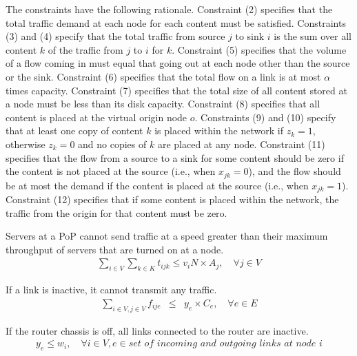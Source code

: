

The constraints have the following rationale.
Constraint (2) specifies that the total traffic demand at each node for each content must be satisfied.
Constraints (3) and (4) specify that the total traffic from source $j$ to sink $i$ is the sum over all content $k$ of the traffic from $j$ to $i$ for $k$.
Constraint (5) specifies that the volume of a flow coming in must equal that going out at each node other than the source or the sink.
Constraint (6) specifies that the total flow on a link is at most $\alpha$ times capacity.
Constraint (7) specifies that the total size of all content stored at a node must be less than its disk capacity.
Constraint (8) specifies that all content is placed at the virtual origin node $o$.
Constraints (9) and (10) specify that at least one copy of content $k$ is placed within the network if $z_k = 1$, otherwise $z_k = 0$ and no copies of $k$ are placed at any node. Constraint (11) specifies that the flow from a source to a sink for some content should be zero if the content is not placed at the source (i.e., when $x_{jk} = 0$), and the flow should be at most the demand if the content is placed at the source  (i.e., when $x_{jk} = 1$).
Constraint (12) specifies that if some content is placed within the network, the traffic from the origin for that content must be zero. 



Servers at a PoP cannot send traffic at a speed greater than their maximum throughput of servers that are turned on at a node.
\begin{eqnarray}
\sum_{i \in V} \sum_{k \in K} t_{ijk}  \leq  v_i N \times A_j,\quad\forall j \in V
\end{eqnarray}

If a link is inactive, it cannot transmit any traffic.
\begin{eqnarray}
\sum_{i \in V, j \in V} f_{ije} &\leq& y_e \times C_e, \quad \forall e \in E
\end{eqnarray}


If the router chassis is off, all links connected to the router are inactive.
\begin{eqnarray}
y_e \leq w_i, \quad \forall i \in V,  e\in \textit{set of incoming and outgoing links at node } i
\end{eqnarray}



